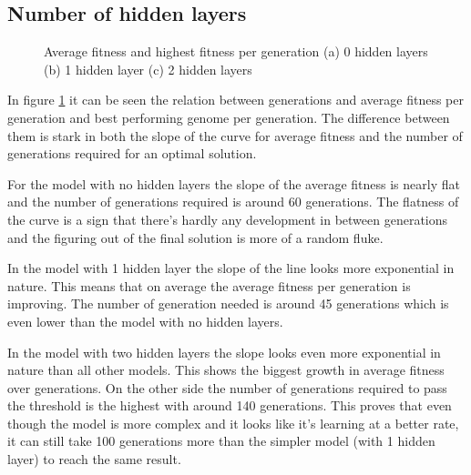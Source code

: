 \documentclass[conference]{IEEEtran}
\begin{document}
\subsection{Number of hidden layers}
\begin{figure}
\centering
{} 
\caption{Average fitness and highest fitness per generation (a) 0 hidden layers (b) 1 hidden layer (c) 2 hidden layers}
\label{fig:Hidden_layers}
\end{figure}
In figure \ref{fig:Hidden_layers} it can be seen the relation between generations and average fitness per generation and best performing genome per generation. The difference between them is stark in both the slope of the curve for average fitness and the number of generations required for an optimal solution.

For the model with no hidden layers the slope of the average fitness is nearly flat and the number of generations required is around 60 generations. The flatness of the curve is a sign that there's hardly any development in between generations and the figuring out of the final solution is more of a random fluke. 

In the model with 1 hidden layer the slope of the line looks more exponential in nature. This means that on average the average fitness per generation is improving. The number of generation needed is around 45 generations which is even lower than the model with no hidden layers.

In the model with two hidden layers the slope looks even more exponential in nature than all other models. This shows the biggest growth in average fitness over generations. On the other side the number of generations required to pass the threshold is the highest with around 140 generations. This proves that even though the model is more complex and it looks like it's learning at a better rate, it can still take 100 generations more than the simpler model (with 1 hidden layer) to reach the same result.
\end{document}
